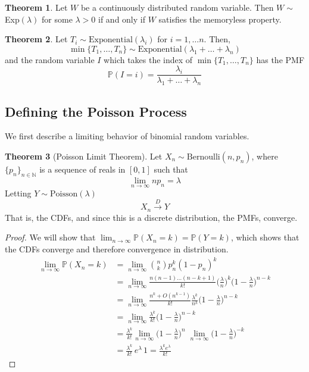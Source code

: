\documentclass{article}
\theoremstyle{definition}
\newtheorem{theorem}{Theorem}[section]
\theoremstyle{remark}
\theoremstyle{definition}
\begin{document}
\begin{theorem}
Let $W$ be a continuously distributed random variable. Then $W \sim$ Exp$(\lambda)$ for some $\lambda > 0$ if and only if $W$ satisfies the memoryless property. 
\end{theorem}

\begin{theorem}
Let $T_i \sim \mathrm{Exponential}(\lambda_i)$ for $i = 1, \ldots n$. Then, 
\[\min\{T_1, \ldots, T_n\} \sim \mathrm{Exponential}(\lambda_1 + \ldots + \lambda_n)\]
and the random variable $I$ which takes the index of $\min\{T_1, \ldots, T_n\}$ has the PMF 
\[\mathbb{P}(I = i) = \frac{\lambda_i}{\lambda_1 + \ldots + \lambda_n}\]
\end{theorem}

\subsection{Defining the Poisson Process}

We first describe a limiting behavior of binomial random variables. 

\begin{theorem}[Poisson Limit Theorem]
Let $X_n \sim \mathrm{Bernoulli}(n, p_n)$, where $\{p_n\}_{n \in \mathbb{N}}$ is a sequence of reals in $[0, 1]$ such that 
\[\lim_{n \rightarrow \infty} n p_n = \lambda\]
Letting $Y \sim \mathrm{Poisson}(\lambda)$
\[X_n \xrightarrow{D} Y\]
That is, the CDFs, and since this is a discrete distribution, the PMFs, converge. 
\end{theorem}
\begin{proof}
We will show that $\lim_{n \rightarrow \infty} \mathbb{P}(X_n = k) = \mathbb{P}(Y = k)$, which shows that the CDFs converge and therefore convergence in distribution. 
\begin{align*}
  \lim_{n \rightarrow \infty} \mathbb{P}(X_n = k) & = \lim_{n \rightarrow \infty} \binom{n}{k} p_n^k (1 - p_n)^k \\
  & = \lim_{n \rightarrow \infty} \frac{n (n - 1) \ldots (n - k + 1)}{k!} \bigg(\frac{\lambda}{n}\bigg)^k \bigg( 1 - \frac{\lambda}{n} \bigg)^{n - k} \\
  & = \lim_{n \rightarrow \infty} \frac{n^k + O(n^{k-1})}{k!} \frac{\lambda^k}{n^k} \bigg( 1 - \frac{\lambda}{n} \bigg)^{n - k} \\
  & = \lim_{n \rightarrow \infty} \frac{\lambda^k}{k!} \bigg( 1 - \frac{\lambda}{n} \bigg)^{n - k} \\
  & = \frac{\lambda^k}{k!} \lim_{n \rightarrow \infty} \bigg( 1 - \frac{\lambda}{n} \bigg)^n \; \lim_{n \rightarrow \infty} \bigg( 1 - \frac{\lambda}{n} \bigg)^{-k} \\
  & = \frac{\lambda^k}{k!} \, e^{\lambda} \, 1 = \frac{\lambda^k e^\lambda}{k!}
\end{align*}
\end{proof}
\end{document}
